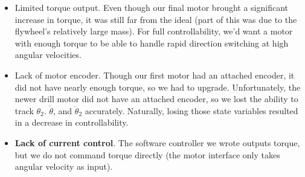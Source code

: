 \documentclass[conference]{IEEEtran}
\begin{document}
\begin{itemize} 
\item
    Limited torque output. Even though our final motor brought a significant
    increase in torque, it was still far from the ideal (part of this was due to
    the flywheel's relatively large mass). For full controllability, we'd want a
    motor with enough torque to be able to handle rapid direction switching at
    high angular velocities.  
\item Lack of motor encoder. Though our first
    motor had an attached encoder, it did not have nearly enough torque, so we
    had to upgrade. Unfortunately, the newer drill motor did not have an
    attached encoder, so we lost the ability to track $\theta_2$.
    $\dot{\theta}$, and $\ddot{\theta}_2$ accurately. Naturally, losing those
    state variables resulted in a decrease in controllability.  
\item \textbf{Lack of current control}. The software controller we wrote outputs torque, but we do
    not command torque directly (the motor interface only takes angular velocity
    as input).
\end{itemize}

    


\end{document}
